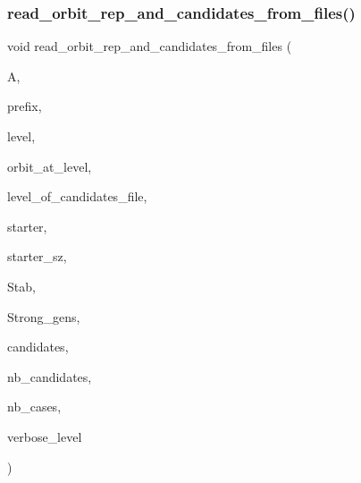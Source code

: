 \subsubsection{\texorpdfstring{read\+\_\+orbit\+\_\+rep\+\_\+and\+\_\+candidates\+\_\+from\+\_\+files()}{read\_orbit\_rep\_and\_candidates\_from\_files()}}
{\footnotesize\ttfamily void read\+\_\+orbit\+\_\+rep\+\_\+and\+\_\+candidates\+\_\+from\+\_\+files (\begin{DoxyParamCaption}\item[{\mbox{\hyperlink{classaction}{action}} $\ast$}]{A,  }\item[{\mbox{\hyperlink{galois_8h_ab6cc7b4aeb6ea31aba2b3fbfc83ff5e6}{B\+Y\+TE}} $\ast$}]{prefix,  }\item[{\mbox{\hyperlink{galois_8h_a09fddde158a3a20bd2dcadb609de11dc}{I\+NT}}}]{level,  }\item[{\mbox{\hyperlink{galois_8h_a09fddde158a3a20bd2dcadb609de11dc}{I\+NT}}}]{orbit\+\_\+at\+\_\+level,  }\item[{\mbox{\hyperlink{galois_8h_a09fddde158a3a20bd2dcadb609de11dc}{I\+NT}}}]{level\+\_\+of\+\_\+candidates\+\_\+file,  }\item[{\mbox{\hyperlink{galois_8h_a09fddde158a3a20bd2dcadb609de11dc}{I\+NT}} $\ast$\&}]{starter,  }\item[{\mbox{\hyperlink{galois_8h_a09fddde158a3a20bd2dcadb609de11dc}{I\+NT}} \&}]{starter\+\_\+sz,  }\item[{\mbox{\hyperlink{classsims}{sims}} $\ast$\&}]{Stab,  }\item[{\mbox{\hyperlink{classstrong__generators}{strong\+\_\+generators}} $\ast$\&}]{Strong\+\_\+gens,  }\item[{\mbox{\hyperlink{galois_8h_a09fddde158a3a20bd2dcadb609de11dc}{I\+NT}} $\ast$\&}]{candidates,  }\item[{\mbox{\hyperlink{galois_8h_a09fddde158a3a20bd2dcadb609de11dc}{I\+NT}} \&}]{nb\+\_\+candidates,  }\item[{\mbox{\hyperlink{galois_8h_a09fddde158a3a20bd2dcadb609de11dc}{I\+NT}} \&}]{nb\+\_\+cases,  }\item[{\mbox{\hyperlink{galois_8h_a09fddde158a3a20bd2dcadb609de11dc}{I\+NT}}}]{verbose\+\_\+level }\end{DoxyParamCaption})}

\mbox{\label{snakes__and__ladders__global_8_c_ae0699dce825e1542730bc5ca5ff41cf9}} 
